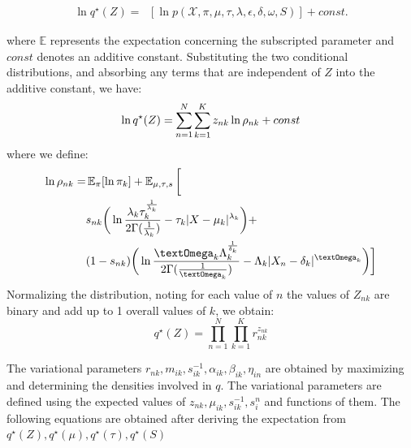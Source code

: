 \documentclass[letterpaper]{article}
\begin{document}
\begin{equation}
    \begin{split}
        \ln q^\star(Z) = \mathop{\mathbb{E}_{\mu, \tau, \pi, s}}[\ln p(\mathcal{X}, \pi,\mu, \tau, \lambda, \epsilon, \delta, \omega, S)] + const.    
    \end{split}
\end{equation}



where $\mathbb{E}$ represents the expectation concerning the subscripted parameter and $const$ denotes an additive constant.
Substituting the two conditional distributions, and absorbing any terms that are independent of $Z$ into the additive constant, we have:
\begin{equation}
    \ln q^\star(Z) =  \sum_{\mathclap{n=1}}^{N} \sum_{\mathclap{k=1}}^{K}z_{nk} \ln \rho_{nk} + const
\end{equation}
where we define:
\begin{equation}
    \begin{split}\label{rownk}
        \ln \rho_{nk} = &\mathop{\mathbb{E}_{\pi}}[\ln \pi_k] + \mathop{\mathbb{E}_{\mu, \tau, s}} \bigg[\\
            &s_{nk}\bigg(\ln \frac{\lambda_k \tau_k^{\frac{1}{\lambda_k}}}{2 \Gamma (\frac{1}{\lambda_k})} - \tau_k|X - \mu_k|^{\lambda_k} \bigg)+\\
            &(1-s_{nk})\bigg(\ln \frac{\textOmega_k\Lambda_k^{\frac{1}{\delta_k}}}{2\Gamma(\frac{1}{\textOmega_k})} - 
         \Lambda_k |X_n - \delta_k|^{\textOmega_k}\bigg)\bigg]    
    \end{split}
\end{equation}
Normalizing the distribution, noting for each value of $n$ the values of $Z_{nk}$ are binary and add up to 1 overall values of $k$, we obtain:
\begin{equation}
    q^\star(Z) = \prod_{n=1}^{N}\prod_{k=1}^{K} r_{nk}^{z_{nk}}
\end{equation}

The variational parameters $r_{nk}, m_{ik}, s_{ik}^{-1},\alpha_{ik}, \beta_{ik}, \eta_{in} $ are obtained by maximizing and determining the densities involved in $q$. 
The variational parameters are defined using the expected values of $z_{nk}, \mu_{ik}, s_{ik}^{-1}, s_i^n$ and functions of them. 
The following equations are obtained after deriving the expectation from $q^\star(Z),q^\star(\mu),q^\star(\tau), q^\star(S)$
\end{document}
